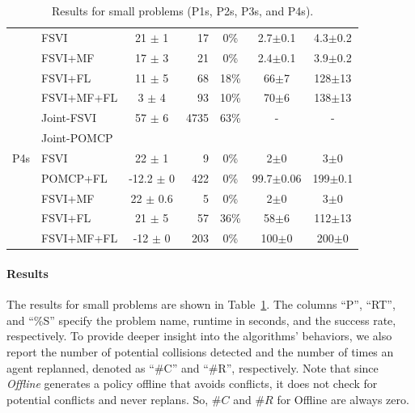 \documentclass[letterpaper]{article} %
\newcommand{\itay}[1]{}
\begin{document}
\begin{table}
{\begin{tabular}{ |c|l|c|r|c|c|c| }
    & FSVI\itay{+} & 21 $\pm$ 1 & 17 & 0\% & 2.7$\pm$0.1 & 4.3$\pm$0.2 \\
    & FSVI+MF\itay{+} & 17 $\pm$ 3 & 21 & 0\% & 2.4$\pm$0.1 & 3.9$\pm$0.2 \\
    &FSVI+FL\itay{+} & 11 $\pm$ 5 & 68 & 18\% & 66$\pm$7 & 128$\pm$13 \\
    & FSVI+MF+FL\itay{+} & 3 $\pm$ 4 & 93 & 10\% & 70$\pm$6 & 138$\pm$13 \\
    \hline
    \hline
    \multirow{5}{*}{P4s} 
    & Joint-FSVI\itay{+} & 57 $\pm$ 6 & 4735 & 63\% &  - & - \\ 
    & Joint-POMCP &&&&& \\
    & FSVI\itay{+} & 22 $\pm$ 1 & 9 & 0\% & 2$\pm$0 & 3$\pm$0 \\
    & POMCP+FL\itay{+} & -12.2 $\pm$ 0 & 422 & 0\% & 99.7$\pm$0.06 & 199$\pm$0.1 \\
    & FSVI+MF\itay{+} & 22 $\pm$ 0.6 & 5 & 0\% &  2$\pm$0 & 3$\pm$0 \\
    &FSVI+FL\itay{+} & 21 $\pm$ 5 & 57 & 36\% & 58$\pm$6 & 112$\pm$13 \\
    & FSVI+MF+FL\itay{+} & -12 $\pm$ 0 & 203 & 0\% &  100$\pm$0 & 200$\pm$0 \\
    \hline
    \hline
     \end{tabular}
     }
    \caption{Results for small problems (P1s, P2s, P3s, and P4s).\itay{** Average run-time in 200 runs}}
    \label{tab:2small-results}
    \vspace{-0.3cm}
\end{table}




\paragraph{Results} 

The results for small problems are shown in Table~\ref{tab:2small-results}. 
The columns ``P'', ``RT'', and ``\%S'' specify the problem name, runtime in seconds, and the success rate, respectively. 
To provide deeper insight into the algorithms' behaviors, we also report the number of potential collisions detected and the number of times an agent replanned, denoted as ``\#C'' and ``\#R'', respectively. Note that since \emph{Offline} generates a policy offline that avoids conflicts, it does not check for potential conflicts and never replans. So, $\#C$ and $\#R$ for Offline are always zero. %
\end{document}
